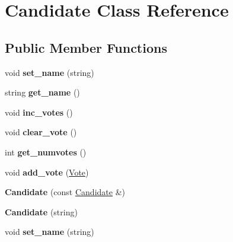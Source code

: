 \hypertarget{classCandidate}{\section{\-Candidate \-Class \-Reference}
\label{classCandidate}
}
\subsection*{\-Public \-Member \-Functions}
\begin{DoxyCompactItemize}
\item 
\hypertarget{classCandidate_aa71c5e7a8e5873bc60ba7277259b557f}{void {\bfseries set\-\_\-name} (string)}\label{classCandidate_aa71c5e7a8e5873bc60ba7277259b557f}

\item 
\hypertarget{classCandidate_a3d8b668603df6dd67e82536b8e19d038}{string {\bfseries get\-\_\-name} ()}\label{classCandidate_a3d8b668603df6dd67e82536b8e19d038}

\item 
\hypertarget{classCandidate_ad1510f0751e955efe3e839b2e895212e}{void {\bfseries inc\-\_\-votes} ()}\label{classCandidate_ad1510f0751e955efe3e839b2e895212e}

\item 
\hypertarget{classCandidate_abe8de7922a9a9e44d0a4d39e6d98c92b}{void {\bfseries clear\-\_\-vote} ()}\label{classCandidate_abe8de7922a9a9e44d0a4d39e6d98c92b}

\item 
\hypertarget{classCandidate_a0b03c5eb1b106c82f4e2bf4f2d131153}{int {\bfseries get\-\_\-numvotes} ()}\label{classCandidate_a0b03c5eb1b106c82f4e2bf4f2d131153}

\item 
\hypertarget{classCandidate_a2fc0d1f3cc86d97a2f67a44b114c2efa}{void {\bfseries add\-\_\-vote} (\hyperlink{classVote}{\-Vote})}\label{classCandidate_a2fc0d1f3cc86d97a2f67a44b114c2efa}

\item 
\hypertarget{classCandidate_a5bc62d2f4a945f20db0b0f75363439b9}{{\bfseries \-Candidate} (const \hyperlink{classCandidate}{\-Candidate} \&)}\label{classCandidate_a5bc62d2f4a945f20db0b0f75363439b9}

\item 
\hypertarget{classCandidate_a8fe5607955ab82eb05d6af1a9ce26e0a}{{\bfseries \-Candidate} (string)}\label{classCandidate_a8fe5607955ab82eb05d6af1a9ce26e0a}

\item 
\hypertarget{classCandidate_aa71c5e7a8e5873bc60ba7277259b557f}{void {\bfseries set\-\_\-name} (string)}\label{classCandidate_aa71c5e7a8e5873bc60ba7277259b557f}


\end{DoxyCompactItemize}
